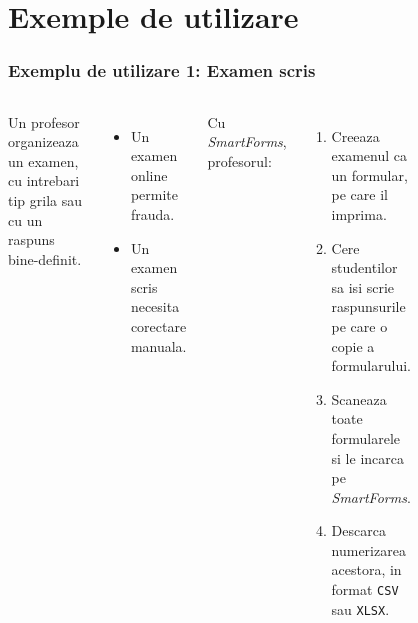 \documentclass[9pt]{beamer}
\def\code#1{\texttt{#1}}
\begin{document}
\section{Exemple de utilizare}

\begin{frame}
	\frametitle{Exemplu de utilizare 1: Examen scris}
	\begin{columns}
		Un profesor organizeaza un examen, cu intrebari tip grila sau cu un raspuns bine-definit.\\
		\begin{itemize}
			\item Un examen online permite frauda.
			\item Un examen scris necesita corectare manuala.
		\end{itemize}
		\vspace{10pt}
		Cu \textit{SmartForms}, profesorul:
		\begin{enumerate}
			\item Creeaza examenul ca un formular, pe care il imprima.
			\item Cere studentilor sa isi scrie raspunsurile pe care o copie a formularului.
			\item Scaneaza toate formularele si le incarca pe \textit{SmartForms}.
			\item Descarca numerizarea acestora, in format \code{CSV} sau \code{XLSX}.
		\end{enumerate}
		\begin{figure}[!h]
			\centering
		\end{figure}
	\end{columns}
\end{frame}
\end{document}
